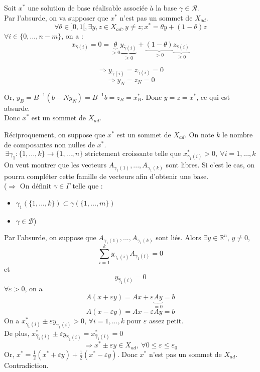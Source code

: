 \begin{dem}
Soit $x^*$ une solution de base réalisable associée à la base $\gamma\in\mathcal{R}$.\\
Par l'absurde, on va supposer que $x^*$ n'est pas un sommet de $X_{ad}$.
	\[\forall \theta\in]0,1[, \exists y,z\in X_{ad}, y\neq z; x^*=\theta y+(1-\theta)z\]
$\forall i\in\{0,...,n-m\}$, on a :
	\[x_{\hat{\gamma}(i)}=0=\underbrace{\theta}_{>0} \underbrace{y_{\hat{\gamma}(i)}}_{\geq 0} + \underbrace{(1-\theta)}_{>0}\underbrace{z_{\hat{\gamma}(i)}}_{\geq 0}\]

	\[\Rightarrow y_{\hat{\gamma}(i)}=z_{\hat{\gamma}(i)}=0\]
	\[\Rightarrow y_N=z_N=0\]

Or, $y_B=B^{-1}(b-Ny_N)=B^{-1}b=z_B=x^*_B$. Donc $y=z=x^*$, ce qui est absurde.\\
Donc $x^*$ est un sommet de $X_{ad}$.

\bigskip
Réciproquement, on suppose que $x^*$ est un sommet de $X_{ad}$. On note $k$ le nombre de composantes non nulles de $x^*$. 
\[\exists \gamma_1 : \{1,...,k\}\to\{1,...,n\} \text{ strictement croissante telle que } x^*_{\gamma_1(i)}>0,\ \forall i=1,...,k\]
On veut montrer que les vecteurs $A_{\gamma_1(1)},...,A_{\gamma_1(k)}$ sont libres. Si c'est le cas, on pourra compléter cette famille de vecteurs afin d'obtenir une base.\\
($\Rightarrow$ On définit $\gamma\in\Gamma$ telle que :\begin{itemize}
\item $\gamma_1(\{1,...,k\})\subset\gamma(\{1,...,m\})$
\item $\gamma\in\mathcal{B}$)
\end{itemize}

Par l'absurde, on suppose que $A_{\gamma_1(1)},...,A_{\gamma_1(k)}$ sont liés. Alors $\exists y\in\mathbb{R}^n$, $y\neq 0$, 
\[\sum_{i=1}^k y_{\gamma_1(i)}A_{\gamma_1(i)}=0\]
et \[y_{\hat{\gamma}_1(i)}=0\]
$\forall \varepsilon>0$, on a \[A(x+\varepsilon y)=Ax+\varepsilon \underbrace{Ay}_{=0}=b\]
\[A(x-\varepsilon y)=Ax-\varepsilon Ay = b\]
On a $x^*_{\gamma_1(i)}\pm \varepsilon y_{\gamma_1(i)}>0$, $\forall i=1,...,k$ pour $\varepsilon$ assez petit.\\
De plus, $x^*_{\hat{\gamma}_1(i)}\pm \varepsilon y_{\hat{\gamma}_1(i)}=x^*_{\hat{\gamma}_1(i)}=0$
	\[\Rightarrow x^*\pm\varepsilon y\in X_{ad},\ \forall0\leq \varepsilon \leq \varepsilon_0\]
Or, $x^*=\frac{1}{2}(x^*+\varepsilon y) + \frac{1}{2}(x^*-\varepsilon y)$. Donc $x^*$ n'est pas un sommet de $X_{ad}$. Contradiction.
\end{dem}

